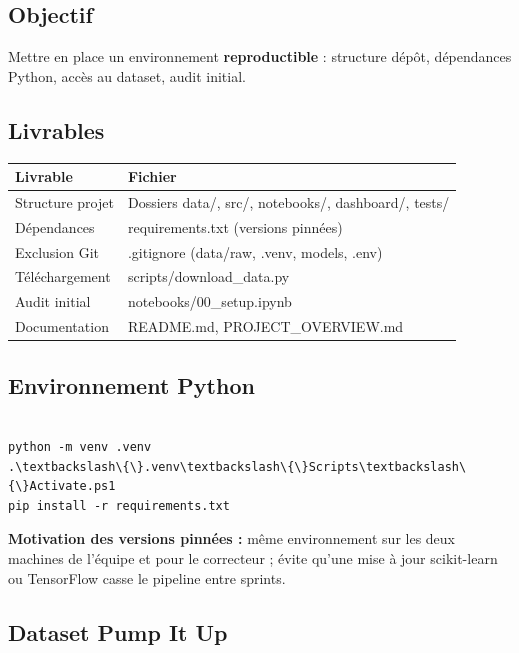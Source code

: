 \documentclass[11pt,a4paper]{report}
\begin{document}
\label{ch:sprint0}

\subsection{Objectif}

Mettre en place un environnement \textbf{reproductible} : structure dépôt, dépendances Python, accès au dataset, audit initial.

\subsection{Livrables}

{\small
\begin{longtable}{@{}>{\raggedright\arraybackslash}p{}>{\raggedright\arraybackslash}p{}@{}}
\toprule
\rowcolor{EHTPTableHead}Livrable & Fichier \\
\midrule
Structure projet & Dossiers data/, src/, notebooks/, dashboard/, tests/ \\
Dépendances & requirements.txt (versions pinnées) \\
Exclusion Git & .gitignore (data/raw, .venv, models, .env) \\
Téléchargement & scripts/download\_data.py \\
Audit initial & notebooks/00\_setup.ipynb \\
Documentation & README.md, PROJECT\_OVERVIEW.md \\
\bottomrule
\end{longtable}
}

\subsection{Environnement Python}

\begin{lstlisting}

python -m venv .venv
.\textbackslash\{\}.venv\textbackslash\{\}Scripts\textbackslash\{\}Activate.ps1
pip install -r requirements.txt

\end{lstlisting}

\textbf{Motivation des versions pinnées :} même environnement sur les deux machines de l'équipe et pour le correcteur ; évite qu'une mise à jour scikit-learn ou TensorFlow casse le pipeline entre sprints.

\subsection{Dataset Pump It Up}
\end{document}
